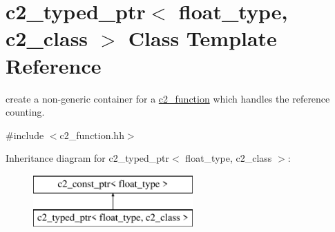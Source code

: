 \hypertarget{classc2__typed__ptr}{\section{c2\-\_\-typed\-\_\-ptr$<$ float\-\_\-type, c2\-\_\-class $>$ Class Template Reference}
\label{classc2__typed__ptr}
}


create a non-\/generic container for a \hyperlink{classc2__function}{c2\-\_\-function} which handles the reference counting.  




{\ttfamily \#include $<$c2\-\_\-function.\-hh$>$}

Inheritance diagram for c2\-\_\-typed\-\_\-ptr$<$ float\-\_\-type, c2\-\_\-class $>$\-:\begin{figure}[H]
\begin{center}
\leavevmode
\includegraphics[height=2.000000cm]{classc2__typed__ptr}
\end{center}
\end{figure}
